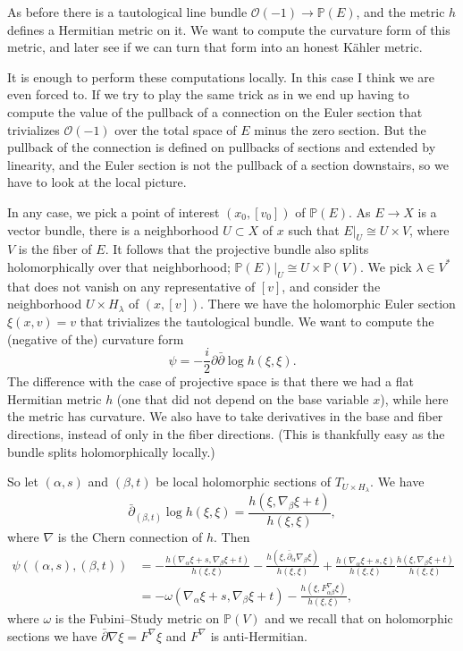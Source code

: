 \documentclass[10pt,a4paper]{article}
\newcommand{\kk}[1]{\mathbb{#1}}
\newcommand{\cc}[1]{\mathcal{#1}}
\begin{document}
As before there is a tautological line bundle $\cc O(-1) \to \kk P(E)$, and the metric $h$ defines a Hermitian metric on it. We want to compute the curvature form of this metric, and later see if we can turn that form into an honest K\"ahler metric.

It is enough to perform these computations locally. In this case I think we are even forced to. If we try to play the same trick as in  we end up having to compute the value of the pullback of a connection on the Euler section that trivializes $\cc O(-1)$ over the total space of $E$ minus the zero section. But the pullback of the connection is defined on pullbacks of sections and extended by linearity, and the Euler section is not the pullback of a section downstairs, so we have to look at the local picture.

In any case, we pick a point of interest $(x_0, [v_0])$ of $\kk P(E)$. As $E \to X$ is a vector bundle, there is a neighborhood $U \subset X$ of $x$ such that $E|_U \cong U \times V$, where $V$ is the fiber of $E$. It follows that the projective bundle also splits holomorphically over that neighborhood; $\kk P(E)|_U \cong U \times \kk P(V)$. We pick $\lambda \in V^*$ that does not vanish on any representative of $[v]$, and consider the neighborhood $U \times H_\lambda$ of $(x, [v])$. There we have the holomorphic Euler section $\xi(x, v) = v$ that trivializes the tautological bundle. We want to compute the (negative of the) curvature form
$$
\psi = -\frac i2 \partial \bar\partial \log h(\xi, \xi).
$$
The difference with the case of projective space is that there we had a flat Hermitian metric $h$ (one that did not depend on the base variable $x$), while here the metric has curvature. We also have to take derivatives in the base and fiber directions, instead of only in the fiber directions. (This is thankfully easy as the bundle splits holomorphically locally.)

So let $(\alpha, s)$ and $(\beta, t)$ be local holomorphic sections of $T_{U \times H_\lambda}$. We have
$$
\bar\partial_{(\beta, t)} \log h(\xi,\xi)
= \frac{h(\xi, \nabla_\beta \xi + t)}{h(\xi,\xi)},
$$
where $\nabla$ is the Chern connection of $h$. Then
\begin{align*}
\psi((\alpha,s), (\beta,t))
&= -\frac{h(\nabla_\alpha \xi + s, \nabla_\beta \xi + t)}{h(\xi,\xi)}
- \frac{h(\xi, \bar\partial_\alpha \nabla_\beta \xi)}{h(\xi,\xi)}
+ \frac{h(\nabla_\alpha \xi + s, \xi)}{h(\xi,\xi)}
\frac{h(\xi, \nabla_\beta \xi + t)}{h(\xi,\xi)}
\\
&= -\omega(\nabla_\alpha \xi + s, \nabla_\beta \xi + t)
- \frac{h(\xi, F^\nabla_{\alpha\beta}\xi)}{h(\xi,\xi)},
\end{align*}
where $\omega$ is the Fubini--Study metric on $\kk P(V)$ and we recall that on holomorphic sections we have $\bar\partial \nabla \xi = F^\nabla \xi$ and $F^\nabla$ is anti-Hermitian.
\end{document}
